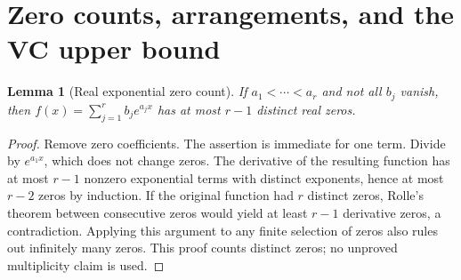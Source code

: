 \documentclass[10pt]{article}
\newtheorem{lemma}[theorem]{Lemma}
\theoremstyle{definition}\newtheorem{definition}[theorem]{Definition}
\theoremstyle{remark}\newtheorem{remark}[theorem]{Remark}
\newcommand{\1}{\mathbf 1}
\begin{document}
\section{Zero counts, arrangements, and the VC upper bound}\label{app:growth}
\begin{lemma}[Real exponential zero count]\label{lem:zeros}
If $a_1<\cdots<a_r$ and not all $b_j$ vanish, then $f(x)=\sum_{j=1}^r b_je^{a_jx}$ has at most $r-1$ distinct real zeros.
\end{lemma}
\begin{proof}
Remove zero coefficients. The assertion is immediate for one term. Divide by $e^{a_1x}$, which does not change zeros. The derivative of the resulting function has at most $r-1$ nonzero exponential terms with distinct exponents, hence at most $r-2$ zeros by induction. If the original function had $r$ distinct zeros, Rolle's theorem between consecutive zeros would yield at least $r-1$ derivative zeros, a contradiction. Applying this argument to any finite selection of zeros also rules out infinitely many zeros. This proof counts distinct zeros; no unproved multiplicity claim is used.
\end{proof}
\end{document}
